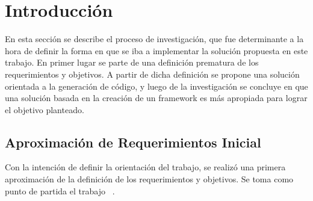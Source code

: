 \section{Introducción}
En esta sección se describe el proceso de investigación, que fue determinante a
la hora de definir la forma en que se iba a implementar la solución propuesta en
este trabajo.
En primer lugar se parte de una definición  prematura de los requerimientos y
objetivos. A partir de dicha definición se propone  una solución orientada a la
generación de código, y luego de la investigación se concluye en que una
solución basada en la creación de un framework es más apropiada para lograr el objetivo planteado.
\subsection{Aproximación de Requerimientos Inicial}
Con la intención de definir la orientación del trabajo, se realizó
una primera aproximación de la definición de los requerimientos y
objetivos.
Se toma como punto de partida el trabajo ~\cite{codegen}.


